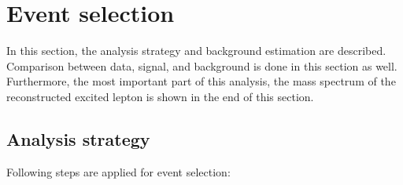 \section{Event selection}

In this section, the analysis strategy and background estimation are described. Comparison between data, signal, and background is done in this section as well. Furthermore, the most important part of this analysis, the mass spectrum of the reconstructed excited lepton is shown in the end of this section.  

\subsection{Analysis strategy} 

Following steps are applied for event selection:


